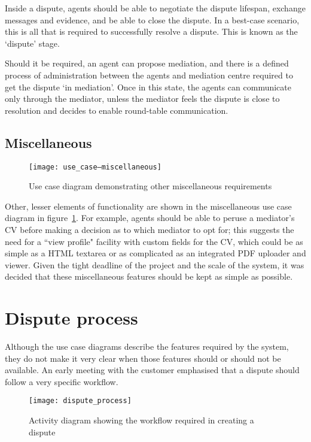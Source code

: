 Inside a dispute, agents should be able to negotiate the dispute lifespan, exchange messages and evidence, and be able to close the dispute. In a best-case scenario, this is all that is required to successfully resolve a dispute. This is known as the `dispute' stage.

Should it be required, an agent can propose mediation, and there is a defined process of administration between the agents and mediation centre required to get the dispute `in mediation'. Once in this state, the agents can communicate only through the mediator, unless the mediator feels the dispute is close to resolution and decides to enable round-table communication.

\subsection{Miscellaneous}

\begin{figure}[h!]
  \centering
    \ifimages
    \texttt{[image: use\_case--miscellaneous]}
    \fi
  \caption{Use case diagram demonstrating other miscellaneous requirements}
  \label{uml:useCase:miscellaneous}
\end{figure}

Other, lesser elements of functionality are shown in the miscellaneous use case diagram in figure~\ref{uml:useCase:miscellaneous}. For example, agents should be able to peruse a mediator's CV before making a decision as to which mediator to opt for; this suggests the need for a ``view profile" facility with custom fields for the CV, which could be as simple as a HTML textarea or as complicated as an integrated PDF uploader and viewer. Given the tight deadline of the project and the scale of the system, it was decided that these miscellaneous features should be kept as simple as possible.

\section{Dispute process}

Although the use case diagrams describe the features required by the system, they do not make it very clear when those features should or should not be available. An early meeting with the customer emphasised that a dispute should follow a very specific workflow.

\begin{figure}[h!]
  \centering
    \ifimages
    \texttt{[image: dispute\_process]}
    \fi
  \caption{Activity diagram showing the workflow required in creating a dispute}
  \label{uml:activity:dispute}
\end{figure}

